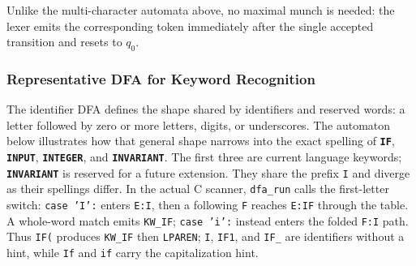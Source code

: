 \documentclass[11pt,a4paper]{article}
\newcommand{\kw}[1]{\texttt{\bfseries\color{pupmaroon}#1}}
\newcommand{\token}[1]{\texttt{#1}}
\newcommand{\codeinline}[1]{\texttt{#1}}
\begin{document}
\begin{center}
\end{center}

Unlike the multi-character automata above, no maximal munch is needed: the lexer emits the corresponding token immediately after the single accepted transition and resets to $q_0$.

\subsubsection{Representative DFA for Keyword Recognition}

The identifier DFA defines the shape shared by identifiers and reserved words: a letter followed by zero or more letters, digits, or underscores. The automaton below illustrates how that general shape narrows into the exact spelling of \kw{IF}, \kw{INPUT}, \kw{INTEGER}, and \kw{INVARIANT}. The first three are current language keywords; \kw{INVARIANT} is reserved for a future extension. They share the prefix \codeinline{I} and diverge as their spellings differ. In the actual C scanner, \codeinline{dfa\_run} calls the first-letter switch: \codeinline{case 'I':} enters \codeinline{E:I}, then a following \codeinline{F} reaches \codeinline{E:IF} through the table. A whole-word match emits \token{KW\_IF}; \codeinline{case 'i':} instead enters the folded \codeinline{F:I} path. Thus \codeinline{IF(} produces \token{KW\_IF} then \token{LPAREN}; \codeinline{I}, \codeinline{IF1}, and \codeinline{IF\_} are identifiers without a hint, while \codeinline{If} and \codeinline{if} carry the capitalization hint.
\end{document}
